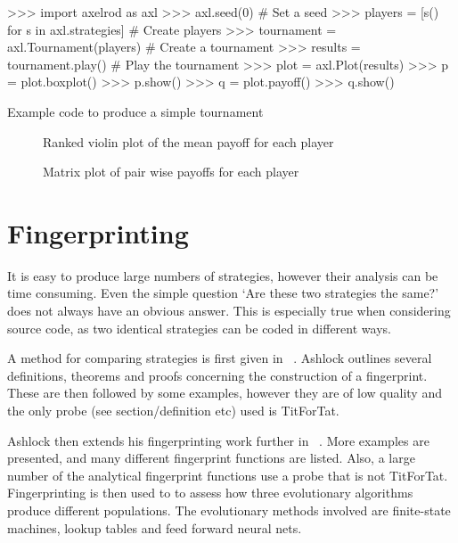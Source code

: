 \begin{listing}[htbp!]
\begin{ExampleCode}
>>> import axelrod as axl
>>> axl.seed(0)  # Set a seed
>>> players = [s() for s in axl.strategies]  # Create players
>>> tournament = axl.Tournament(players)  # Create a tournament
>>> results = tournament.play()  # Play the tournament
>>> plot = axl.Plot(results)
>>> p = plot.boxplot()
>>> p.show()
>>> q = plot.payoff()
>>> q.show()
\end{ExampleCode}
\caption{Example code to produce a simple tournament}
\label{lst:tournament}
\end{listing}

\begin{figure}
\begin{center}
\caption{Ranked violin plot of the mean payoff for each player}
\label{fig:violinplot}
\end{center}

\begin{center}
\caption{Matrix plot of pair wise payoffs for each player}
\label{fig:matrixplot}
\end{center}
\end{figure}


\section{Fingerprinting}\label{sec:fingerprinting}
It is easy to produce large numbers of strategies, however their analysis can be time consuming.
Even the simple question `Are these two strategies the same?' does not always have an obvious answer.
This is especially true when considering source code, as two identical strategies can be coded in different ways.

A method for comparing strategies is first given in ~\cite{Ashlock2004}.
Ashlock outlines several definitions, theorems and proofs concerning the construction of a fingerprint.
These are then followed by some examples, however they are of low quality and the only probe (see section/definition etc) used is TitForTat.

Ashlock then extends his fingerprinting work further in ~\cite{Ashlock2008}.
More examples are presented, and many different fingerprint functions are listed.
Also, a large number of the analytical fingerprint functions use a probe that is not TitForTat.
Fingerprinting is then used to to assess how three evolutionary algorithms produce different populations.
The evolutionary methods involved are finite-state machines, lookup tables and feed forward neural nets.


